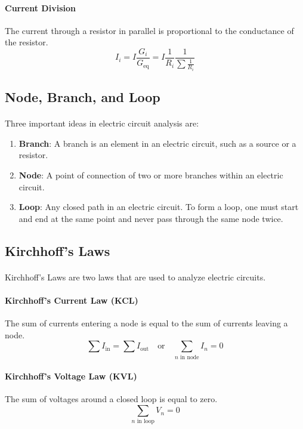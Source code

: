 \documentclass[11pt]{article}
\begin{document}
\paragraph{Current Division} The current through a resistor in parallel is proportional to the conductance of the resistor.
\begin{equation}
    I_i = I \frac{G_i}{G_{\text{eq}}} = I \frac{1}{R_i} \frac{1}{\sum \frac{1}{R_i}}
\end{equation}
\subsection{Node, Branch, and Loop}
\paragraph{} Three important ideas in electric circuit analysis are:
\begin{enumerate}
    \item \textbf{Branch}: A branch is an element in an electric circuit, such as a source or a resistor.
    \item \textbf{Node}: A point of connection of two or more branches within an electric circuit.
    \item \textbf{Loop}: Any closed path in an electric circuit. To form a loop, one must start and end at the same point and never pass through the same node twice.
\end{enumerate}
\subsection{Kirchhoff's Laws}
\paragraph{} Kirchhoff's Laws are two laws that are used to analyze electric circuits.
\paragraph{Kirchhoff's Current Law (KCL)} The sum of currents entering a node is equal to the sum of currents leaving a node.
\begin{equation}
    \sum I_{\text{in}} = \sum I_{\text{out}} \quad \text{or} \quad \sum_\text{$n$ in node} I_n = 0
\end{equation}
\paragraph{Kirchhoff's Voltage Law (KVL)} The sum of voltages around a closed loop is equal to zero.
\begin{equation}
    \sum_\text{$n$ in loop} V_{n} = 0
\end{equation}
\end{document}
